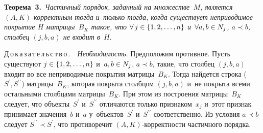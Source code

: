 \begin{multicols}{2}
  \smallskip
  
  \noindent
  \textbf{Теорема~3.}\ \textit{Частичный порядок, заданный на множестве~$M$, 
является $(A,K)$-кор\-рект\-ным тогда и~только тогда, когда существует 
неприводимое покрытие $H$ матрицы~$B_K$ такое, что $\forall\, j\hm\in 
\{1,2,\ldots , n\}$ и~$\forall a,b\hm\in N_j$, $a\prec b$, столбец $(j,b,a)$ не входит 
в}~$H$.
  
  \smallskip
  
  \noindent
  Д\,о\,к\,а\,з\,а\,т\,е\,л\,ь\,с\,т\,в\,о\,.\ \ \textit{Необходимость}. Предположим 
противное. Пусть существуют $j\hm\in \{1,2,\ldots , n\}$ и~$a,b \hm\in N_j$, 
$a\prec b$, такие, что столбец $(j,b,a)$ входит во все неприводимые покрытия 
матрицы~$B_K$. Тогда найдется строка ($S^\prime, S^{\prime\prime}$) 
матрицы~$B_K$, которая покрыта столбцом $(j,b,a)$ и~не покрыта всеми 
остальными столбцами матрицы~$B_K$. При этом из построения 
матрицы~$B_K$ следует, что объекты~$S^\prime$ и~$S^{\prime\prime}$ 
отличаются только признаком~$x_j$ и~этот признак принимает значения~$b$ 
и~$a$ у~объектов~$S^\prime$ и~$S^{\prime\prime}$ соответственно. Из условия 
$a\prec b$ следует $S^{\prime\prime}\prec S^\prime$, что противоречит  
$(A,K)$-кор\-рект\-ности частичного порядка. 


\end{multicols}
